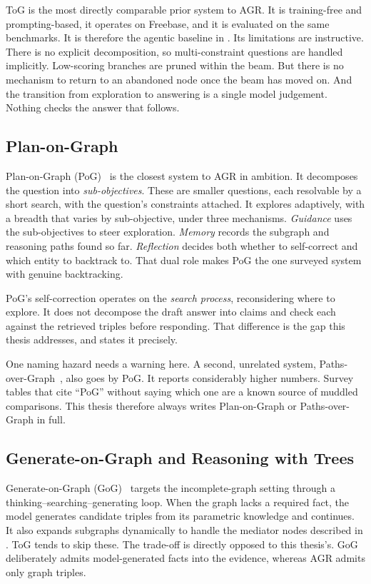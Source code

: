 ToG is the most directly comparable prior system to AGR. It is training-free and
prompting-based, it operates on Freebase, and it is evaluated on the same
benchmarks. It is therefore the agentic baseline in . Its
limitations are instructive. There is no explicit decomposition, so
multi-constraint questions are handled implicitly. Low-scoring branches are
pruned within the beam. But there is no mechanism to return to an abandoned node
once the beam has moved on. And the transition from exploration to answering is
a single model judgement. Nothing checks the answer that follows.

\subsection{Plan-on-Graph}

Plan-on-Graph (PoG)~\cite{chen2024plan} is the closest system to AGR in
ambition. It decomposes the question into \emph{sub-objectives}. These are
smaller questions, each resolvable by a short search, with the question's
constraints attached. It explores adaptively, with a breadth that varies by
sub-objective, under three mechanisms. \emph{Guidance} uses the sub-objectives
to steer exploration. \emph{Memory} records the subgraph and reasoning paths
found so far. \emph{Reflection} decides both whether to self-correct and which
entity to backtrack to. That dual role makes PoG the one surveyed system with
genuine backtracking.

PoG's self-correction operates on the \emph{search process}, reconsidering where
to explore. It does not decompose the draft answer into claims and check each
against the retrieved triples before responding. That difference is the gap this
thesis addresses, and  states it precisely.

One naming hazard needs a warning here. A second, unrelated system,
Paths-over-Graph~\cite{tan2024paths}, also goes by PoG. It reports considerably
higher numbers. Survey tables that cite ``PoG'' without saying which one are a
known source of muddled comparisons. This thesis therefore always writes
Plan-on-Graph or Paths-over-Graph in full.

\subsection{Generate-on-Graph and Reasoning with Trees}

Generate-on-Graph (GoG)~\cite{xu2024generate} targets the incomplete-graph
setting through a thinking--searching--generating loop. When the graph lacks a
required fact, the model generates candidate triples from its parametric
knowledge and continues. It also expands subgraphs dynamically to handle the
mediator nodes described in . ToG tends to skip these. The
trade-off is directly opposed to this thesis's. GoG deliberately admits
model-generated facts into the evidence, whereas AGR admits only graph triples.

